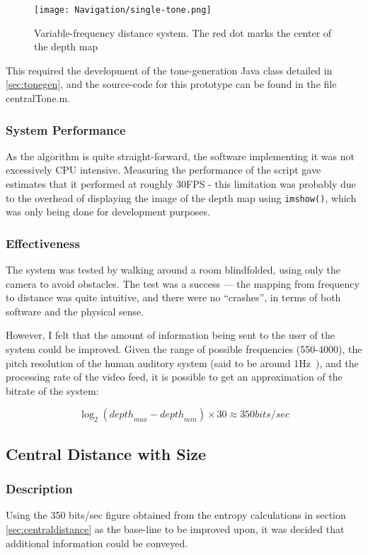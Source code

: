 \begin{figure}[H]
\centering
\texttt{[image: Navigation/single-tone.png]}
\caption{Variable-frequency distance system. The red dot marks the center of the depth map}
\end{figure}

This required the development of the tone-generation Java class detailed in \ref{sec:tonegen}, and the source-code for this prototype can be found in the file centralTone.m.

\subsubsection{System Performance}
As the algorithm is quite straight-forward, the software implementing it was not excessively CPU intensive. Measuring the performance of the script gave estimates that it performed at roughly 30FPS - this limitation was probably due to the overhead of displaying the image of the depth map using \lstinline|imshow()|, which was only being done for development purposes.

\subsubsection{Effectiveness}
The system was tested by walking around a room blindfolded, using only the camera to avoid obstacles. The test was a success --- the mapping from frequency to distance was quite intuitive, and there were no ``crashes'', in terms of both software and the physical sense.

However, I felt that the amount of information being sent to the user of the system could be improved. Given the range of possible frequencies (550-4000), the pitch resolution of the human auditory system (said to be around 1Hz~\cite{pitchres}), and the processing rate of the video feed, it is possible to get an approximation of the bitrate of the system:

\begin{equation}
\log _2\left({depth}_{max} - {depth}_{min}\right) \times 30 \approx 350 {bits/sec}
\end{equation}

\subsection{Central Distance with Size}
\subsubsection{Description}
Using the 350 bits/sec figure obtained from the entropy calculations in section \ref{sec:centraldistance} as the base-line to be improved upon, it was decided that additional information could be conveyed.

